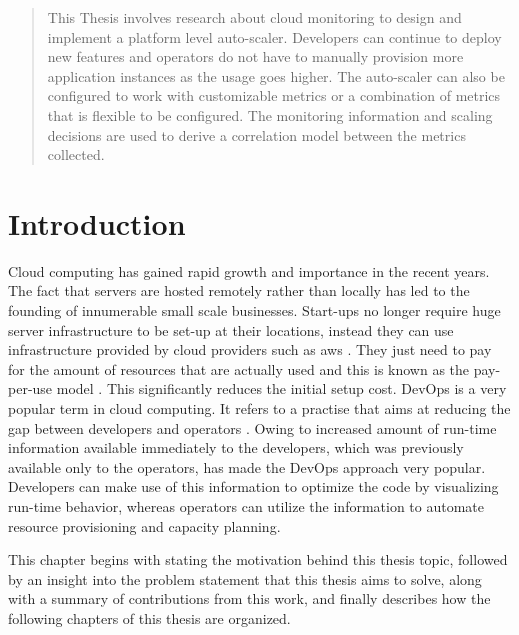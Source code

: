 \documentclass[article,type=msc,colorback,12pt,accentcolor=tud8b,table]{tudthesis}
\begin{document}
\begin{abstract}
	This Thesis involves research about cloud monitoring to design and implement a platform level auto-scaler. Developers can continue to deploy new features and operators do not have to manually provision more application instances as the usage goes higher. The auto-scaler can also be configured to work with customizable metrics or a combination of metrics that is flexible to be configured. The monitoring information and scaling decisions are used to derive a correlation model between the metrics collected.
	

\end{abstract}  

\clearpage

\setlength{ \parskip }{1em}
\tableofcontents 
\cleardoublepage 
\listoffigures
\cleardoublepage 
\listoftables
\clearpage
\cleardoublepage 


\hfill
 \section{Introduction}
	 \hfill \break
	
		Cloud computing has gained rapid growth and importance in the recent years. The fact that servers are hosted remotely rather than locally has led to the founding of innumerable small scale businesses. Start-ups no longer require huge server infrastructure to be set-up at their locations, instead they can use infrastructure provided by cloud providers such as \gls{aws} \cite{aws}. They just need to pay for the amount of resources that are actually used and this is known as the pay-per-use model \cite{armbrust2010view}. This significantly reduces the initial setup cost. DevOps is a very popular term in cloud computing. It refers to a practise that aims at reducing the gap between developers and operators \cite{httermann2012devops}. Owing to increased amount of run-time information available immediately to the developers, which was previously available only to the operators, has made the DevOps approach very popular. Developers can make use of this information to optimize the code by visualizing run-time behavior, whereas operators can utilize the information to automate resource provisioning and capacity planning.
		
		
		\par This chapter begins with stating the motivation behind this thesis topic, followed by an insight into the problem statement that this thesis aims to solve, along with a summary of contributions from this work, and finally describes how the following chapters of this thesis are organized.
	
\end{document}
